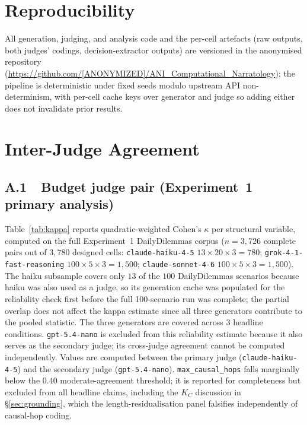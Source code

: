 \documentclass[11pt]{article}
\begin{document}
\section*{Reproducibility}

All generation, judging, and analysis code and the per-cell artefacts
(raw outputs, both judges' codings, decision-extractor outputs) are
versioned in the anonymised repository
(\url{https://github.com/[ANONYMIZED]/ANI_Computational_Narratology});
the pipeline is deterministic under fixed seeds modulo upstream API
non-determinism, with per-cell cache keys over generator and judge so
adding either does not invalidate prior results.



\appendix

\section{Inter-Judge Agreement}
\label{app:kappa}

\subsection*{A.1~~Budget judge pair (Experiment~1 primary analysis)}

Table~\ref{tab:kappa} reports quadratic-weighted Cohen's $\kappa$
\citep{cohen60} per structural variable, computed on the full
Experiment~1 DailyDilemmas corpus ($n = 3{,}726$ complete pairs out of
$3{,}780$ designed cells: \texttt{claude-haiku-4-5} $13 \times 20 \times 3 = 780$;
\texttt{grok-4-1-fast-reasoning} $100 \times 5 \times 3 = 1{,}500$;
\texttt{claude-sonnet-4-6} $100 \times 5 \times 3 = 1{,}500$).
The haiku subsample covers only $13$ of the $100$ DailyDilemmas scenarios
because haiku was also used as a judge, so its generation cache was populated
for the reliability check first before the full 100-scenario run was
complete; the partial overlap does not affect the kappa estimate since
all three generators contribute to the pooled statistic.
The three generators are covered across $3$ headline conditions. \texttt{gpt-5.4-nano} is excluded from
this reliability estimate because it also serves as the secondary judge;
its cross-judge agreement cannot be computed independently.
Values are computed between the primary judge (\texttt{claude-haiku-4-5})
and the secondary judge (\texttt{gpt-5.4-nano}).
\texttt{max\_causal\_hops} falls marginally below the $0.40$
moderate-agreement threshold; it is reported for completeness but
excluded from all headline claims, including the $K_C$ discussion in
\S\ref{sec:grounding}, which the length-residualisation panel
falsifies independently of causal-hop coding.
\end{document}
